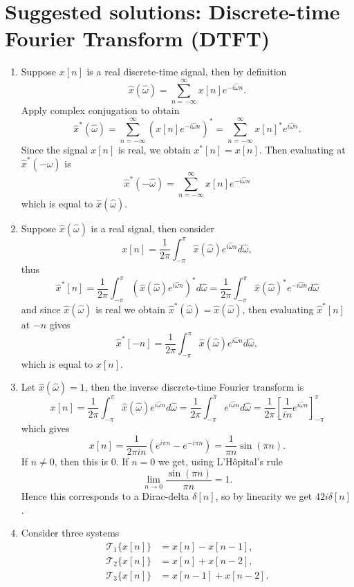 \newpage
\section{Suggested solutions: Discrete-time Fourier Transform (DTFT)}
\begin{enumerate}
\item Suppose $x[n]$ is a real discrete-time signal, then by definition
$$\hat{x}(\hat{\omega})=\sum_{n=-\infty}^{\infty}x[n]e^{-i\hat{\omega}n}.$$
Apply complex conjugation to obtain
$$\hat{x}^{*}(\hat{\omega})=\sum_{n=-\infty}^{\infty}(x[n]e^{-i\hat{\omega}n})^{*}=\sum_{n=-\infty}^{\infty}x[n]^{*}e^{i\hat{\omega}n}.$$
Since the signal $x[n]$ is real, we obtain $x^{*}[n]=x[n]$. Then evaluating at $\hat{x}^{*}(-\hat{\omega})$ is
$$\hat{x}^{*}(-\hat{\omega})=\sum_{n=-\infty}^{\infty}x[n]e^{-i\hat{\omega}n}$$
which is equal to $\hat{x}(\hat{\omega})$. 

\item Suppose $\hat{x}(\hat{\omega})$ is a real signal, then consider
$$x[n]=\frac{1}{2\pi}\int_{-\pi}^{\pi}\hat{x}(\hat{\omega})e^{i\hat{\omega}n}d\hat{\omega},$$
thus
$$\hat{x}^{*}[n]=\frac{1}{2\pi}\int_{-\pi}^{\pi}(\hat{x}(\hat{\omega})e^{i\hat{\omega}n})^{*}d\hat{\omega}=\frac{1}{2\pi}\int_{-\pi}^{\pi}\hat{x}(\hat{\omega})^{*}e^{-i\hat{\omega}n}d\hat{\omega}$$
and since $\hat{x}(\hat{\omega})$ is real we obtain $\hat{x}^{*}(\hat{\omega})=\hat{x}(\hat{\omega})$, then evaluating $\hat{x}^{*}[n]$ at $-n$ gives
$$\hat{x}^{*}[-n]=\frac{1}{2\pi}\int_{-\pi}^{\pi}\hat{x}(\hat{\omega})e^{i\hat{\omega}n}d\hat{\omega},$$
which is equal to $x[n]$. 

\item Let $\hat{x}(\hat{\omega})=1$, then the inverse discrete-time Fourier transform is
$$x[n]=\frac{1}{2\pi}\int_{-\pi}^{\pi}\hat{x}(\hat{\omega})e^{i\hat{\omega}n}d\hat{\omega}=\frac{1}{2\pi}\int_{-\pi}^{\pi}e^{i\hat{\omega}n}d\hat{\omega}=\frac{1}{2\pi}\left[\frac{1}{in}e^{i\hat{\omega}n}\right]_{-\pi}^{\pi}$$
which gives
$$x[n]=\frac{1}{2\pi in}(e^{i\pi n}-e^{-i\pi n})=\frac{1}{\pi n}\sin(\pi n).$$
If $n\neq 0$, then this is $0$. If $n=0$ we get, using L'Hôpital's rule
$$\lim_{n\to 0}\frac{\sin(\pi n)}{\pi n}=1.$$
Hence this corresponds to a Dirac-delta $\delta[n]$, so by linearity we get $42i\delta[n]$. 

\item Consider three systems
\begin{align*}
    \mathcal{T}_{1}\{x[n]\}&=x[n]-x[n-1], \\
    \mathcal{T}_{2}\{x[n]\}&=x[n]+x[n-2], \\
    \mathcal{T}_{3}\{x[n]\}&=x[n-1]+x[n-2].
\end{align*}


\end{enumerate}
